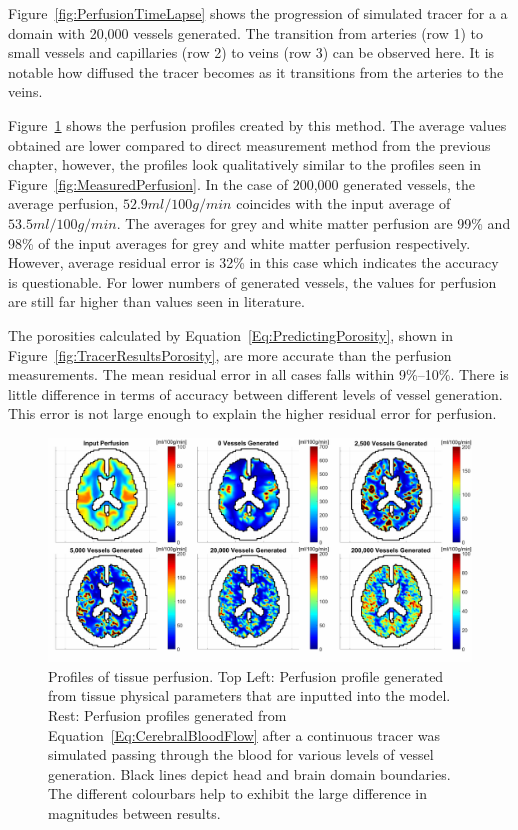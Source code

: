 \documentclass[11pt,english,a4paper,twoside,openright]{report}
\begin{document}
{{{{{{{{Figure~\ref{fig:PerfusionTimeLapse} shows the progression of simulated tracer for a a domain with 20,000 vessels generated. The transition from arteries (row 1) to small vessels and capillaries (row 2) to veins (row 3) can be observed here. It is notable how diffused the tracer becomes as it transitions from the arteries to the veins. 

Figure~\ref{fig:TracerResults1} shows the perfusion profiles created by this method. The average values obtained are lower compared to direct measurement method from the previous chapter, however, the profiles look qualitatively similar to the profiles seen in Figure~\ref{fig:MeasuredPerfusion}. In the case of 200,000 generated vessels, the average perfusion, $52.9ml/100g/min$ coincides with the input average of $53.5ml/100g/min$. The averages for grey and white matter perfusion are 99\% and 98\% of the input averages for grey and white matter perfusion respectively. However, average residual error is 32\% in this case which indicates the accuracy is questionable. For lower numbers of generated vessels, the values for perfusion are still far higher than values seen in literature.

The porosities calculated by Equation~\ref{Eq:PredictingPorosity}, shown in Figure~\ref{fig:TracerResultsPorosity}, are more accurate than the perfusion measurements. The mean residual error in all cases falls within 9\%--10\%. There is little difference in terms of accuracy between different levels of vessel generation. This error is not large enough to explain the higher residual error for perfusion. 

\begin{figure}[p]
	\centering
	\includegraphics[width=\textwidth]{Chapter4/TracerPerfusion1}
	\caption[Profiles of tissue perfusion generated using the continuous tracer method compared to the input perfusion]{Profiles of tissue perfusion. Top Left: Perfusion profile generated from tissue physical parameters that are inputted into the model. Rest: Perfusion profiles generated from Equation~\ref{Eq:CerebralBloodFlow} after a continuous tracer was simulated passing through the blood for various levels of vessel generation. Black lines depict head and brain domain boundaries. The different colourbars help to exhibit the large difference in magnitudes between results.}
	\label{fig:TracerResults1}
\end{figure}

}}}}}}}}
\end{document}
